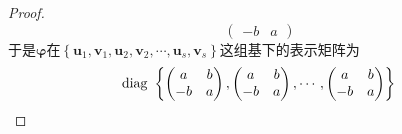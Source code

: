 {\begin{proof}
\[\begin{pmatrix}
                -b & a
            \end{pmatrix}
        \]于是$\bm{\varphi}$在$\left\{
            \bm{u}_1,\bm{v}_1,\bm{u}_2,\bm{v}_2,\cdots,\bm{u}_s,\bm{v}_s
            \right\}$这组基下的表示矩阵为\[
            \operatorname{diag\,} \,\left\{
            \begin{pmatrix}
                a  & b \\
                -b & a
            \end{pmatrix},\begin{pmatrix}
                a  & b \\
                -b & a
            \end{pmatrix},\cdots,\begin{pmatrix}
                a  & b \\
                -b & a
            \end{pmatrix}
            \right\}\qedhere
        \]
    \end{proof}
}
